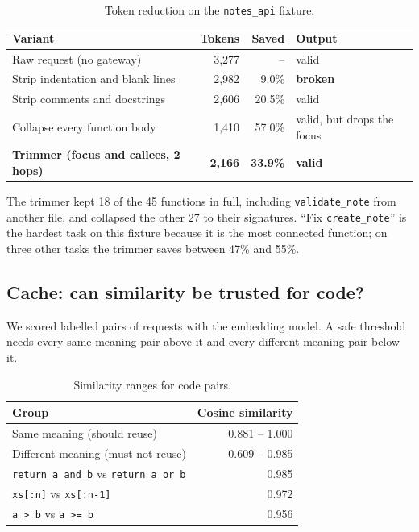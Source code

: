 \documentclass[12pt, a4paper, oneside]{report}
\newcommand{\code}[1]{\texttt{#1}}
\begin{document}
\begin{table}[H]
\centering
\begin{tabular}{lrrl}
\toprule
Variant & Tokens & Saved & Output \\
\midrule
Raw request (no gateway)                         & 3,277 & --      & valid \\
Strip indentation and blank lines                & 2,982 & 9.0\%  & \textbf{broken} \\
Strip comments and docstrings                    & 2,606 & 20.5\% & valid \\
Collapse every function body                     & 1,410 & 57.0\% & valid, but drops the focus \\
\textbf{Trimmer (focus and callees, 2 hops)}     & \textbf{2,166} & \textbf{33.9\%} & \textbf{valid} \\
\bottomrule
\end{tabular}
\caption{Token reduction on the \code{notes\_api} fixture.}
\label{tab:trimmer}
\end{table}

The trimmer kept 18 of the 45 functions in full, including \code{validate\_note}
from another file, and collapsed the other 27 to their signatures. ``Fix
\code{create\_note}'' is the hardest task on this fixture because it is the most
connected function; on three other tasks the trimmer saves between 47\% and 55\%.

\subsection{Cache: can similarity be trusted for code?}
\label{sec:cache-results}

We scored labelled pairs of requests with the embedding model. A safe threshold
needs every same-meaning pair above it and every different-meaning pair below it.

\begin{table}[H]
\centering
\begin{tabular}{lr}
\toprule
Group & Cosine similarity \\
\midrule
Same meaning (should reuse)          & 0.881 -- 1.000 \\
Different meaning (must not reuse)   & 0.609 -- 0.985 \\
\midrule
\code{return a and b} vs \code{return a or b} & 0.985 \\
\code{xs[:n]} vs \code{xs[:n-1]}               & 0.972 \\
\code{a > b} vs \code{a >= b}                  & 0.956 \\
\bottomrule
\end{tabular}
\caption{Similarity ranges for code pairs.}
\label{tab:threshold}
\end{table}
\end{document}
